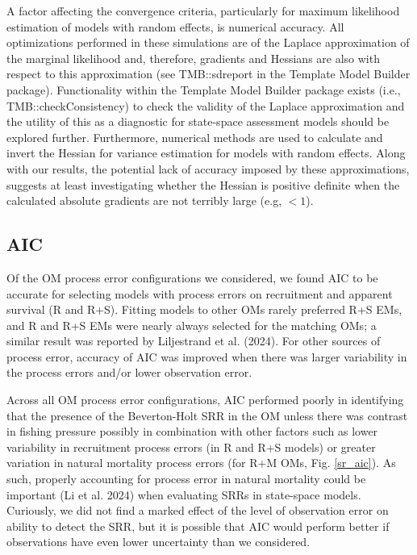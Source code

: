 \documentclass[
  12pt,
]{article}
\begin{document}
A factor affecting the convergence criteria, particularly for maximum
likelihood estimation of models with random effects, is numerical
accuracy. All optimizations performed in these simulations are of the
Laplace approximation of the marginal likelihood and, therefore,
gradients and Hessians are also with respect to this approximation (see
TMB::sdreport in the Template Model Builder package). Functionality
within the Template Model Builder package exists (i.e.,
TMB::checkConsistency) to check the validity of the Laplace
approximation and the utility of this as a diagnostic for state-space
assessment models should be explored further. Furthermore, numerical
methods are used to calculate and invert the Hessian for variance
estimation for models with random effects. Along with our results, the
potential lack of accuracy imposed by these approximations, suggests at
least investigating whether the Hessian is positive definite when the
calculated absolute gradients are not terribly large (e.g, \(< 1\)).

\hypertarget{aic}{%
\subsection*{AIC}\label{aic}}

Of the OM process error configurations we considered, we found AIC to be
accurate for selecting models with process errors on recruitment and
apparent survival (R and R+S). Fitting models to other OMs rarely
preferred R+S EMs, and R and R+S EMs were nearly always selected for the
matching OMs; a similar result was reported by Liljestrand et al.
(2024). For other sources of process error, accuracy of AIC was improved
when there was larger variability in the process errors and/or lower
observation error.

Across all OM process error configurations, AIC performed poorly in
identifying that the presence of the Beverton-Holt SRR in the OM unless
there was contrast in fishing pressure possibly in combination with
other factors such as lower variability in recruitment process errors
(in R and R+S models) or greater variation in natural mortality process
errors (for R+M OMs, Fig. \ref{sr_aic}). As such, properly accounting
for process error in natural mortality could be important (Li et al.
2024) when evaluating SRRs in state-space models. Curiously, we did not
find a marked effect of the level of observation error on ability to
detect the SRR, but it is possible that AIC would perform better if
observations have even lower uncertainty than we considered.
\end{document}

